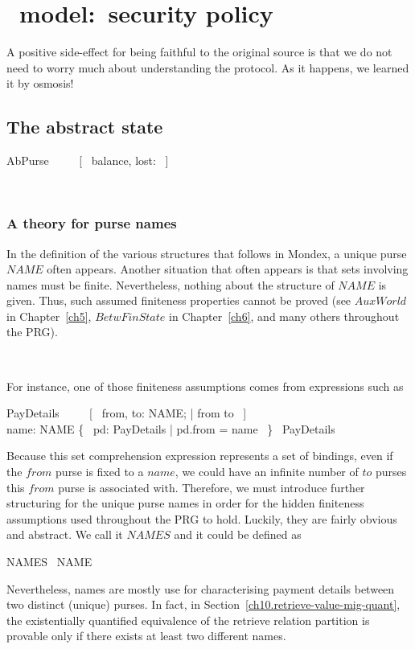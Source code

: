 \chapter{\Abs\ model:~security policy}\label{ch3}

A positive side-effect for being faithful to the
original source is that we do not need to worry
much about understanding the protocol. As it happens,
we learned it by osmosis!

\section{The abstract state}\label{ch3.abstractState}

\begin{LSDef}
\begin{zed}
   AbPurse ~~~~ [~ balance, lost: \nat ~]
\end{zed}~\end{LSDef}

\subsection{A theory for purse names}\label{ch3.pursenames}

In the definition of the various structures that follows in Mondex,
a unique purse $NAME$ often appears. Another situation that often appears
is that sets involving names must be finite. Nevertheless, nothing about the
structure of $NAME$ is given. Thus, such assumed finiteness properties
cannot be proved (see $AuxWorld$ in Chapter~\ref{ch5}, $BetwFinState$ in Chapter~\ref{ch6},
and many others throughout the PRG).
%
\begin{LGSet}
\begin{zed}
  [NAME]
\end{zed}~\end{LGSet}
%
For instance, one of those finiteness assumptions comes from expressions such as
%
\begin{gzed}
   PayDetails ~~~~ [~ from, to: NAME; \cdots | from \neq to ~]
   \\
   name: NAME \shows \{~ pd: PayDetails | pd.from = name ~\} \in \finset~PayDetails
\end{gzed}
%
Because this set comprehension expression represents a set of bindings, even
if the $from$ purse is fixed to a $name$, we could have an infinite number of
$to$ purses this $from$ purse is associated with. Therefore, we must introduce
further structuring for the unique purse names in order for the hidden finiteness
assumptions used throughout the PRG to hold. Luckily, they are fairly obvious and
abstract. We call it $NAMES$ and it could be defined as
%
\begin{gzed}
   NAMES \in \finset~NAME
\end{gzed}
%
Nevertheless, names are mostly use for characterising payment details between two
distinct (unique) purses. In fact, in Section~\ref{ch10.retrieve-value-mig-quant},
the existentially quantified equivalence of the retrieve relation partition is
provable only if there exists at least two different names.

